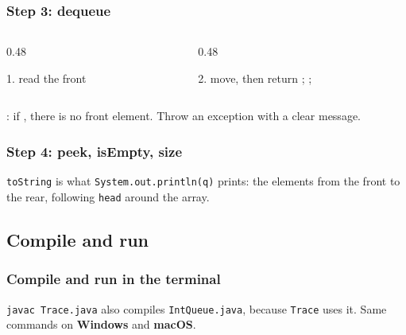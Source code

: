 \documentclass[aspectratio=169,10pt,compress]{beamer}
\newcommand{\win}{\textbf{Windows}}
\newcommand{\mac}{\textbf{macOS}}
\begin{document}
\begin{frame}[t,fragile] \frametitle{Step 3: dequeue}
  \begin{columns}[T]
    \begin{column}{0.48\textwidth}
      \begin{block}{1. read the front}
        \small {}
      \end{block}
    \end{column}
    \begin{column}{0.48\textwidth}
      \begin{block}{2. move, then return}
        \small {}; ; 
      \end{block}
    \end{column}
  \end{columns}
  \small {}: if , there is no front element. Throw an exception with a clear message.
\end{frame}




\begin{frame}[t,fragile] \frametitle{Step 4: peek, isEmpty, size}
  \small \texttt{toString} is what \texttt{System.out.println(q)} prints: the elements from the front to the rear, following \texttt{head} around the array.
\end{frame}

\subsection[Compile]{Compile and run}




\begin{frame}[t,fragile] \frametitle{Compile and run in the terminal}

  \vspace{0.1em}
  \small
  \texttt{javac Trace.java} also compiles \texttt{IntQueue.java}, because \texttt{Trace} uses it. Same commands on \win{} and \mac.
\end{frame}
\end{document}
